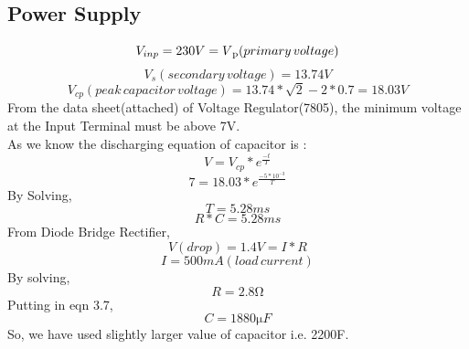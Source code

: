         \subsection{Power Supply}
       \begin{equation}
      V_{inp}=230V=V\textsubscript{p} (primary\,voltage) 
      \end{equation} 
      \begin{equation}
       V_{s}(secondary\,voltage)=13.74V
             \end{equation} 
             \begin{equation}
             V_{cp}(peak\,capacitor\,voltage)=13.74*\sqrt{2}-2*0.7 = 18.03V
            \end{equation}
            From the data sheet(attached) of Voltage Regulator(7805), the minimum voltage at the Input Terminal must be above 7V.\\
           As we know the discharging equation of capacitor is :
             \begin{equation}
             V=V_{cp}*e^\frac{-t}{T}
             \end{equation}
            \begin{equation}
            7=18.03*e^\frac{-5*10^{-3}}{T}
             \end{equation}
             By Solving,
             \begin{equation}
             T=5.28ms
             \end{equation}
              \begin{equation}
             R*C=5.28ms
             \end{equation}
             From Diode Bridge Rectifier,
              \begin{equation}
             V(drop)=1.4V=I*R
             \end{equation}
              \begin{equation}
            I=500mA(load\,current)
             \end{equation}
       	By solving, 
       	\begin{equation}
             R=2.8{\si{\ohm}}
             \end{equation}
             Putting in eqn 3.7,
             \begin{equation}
             C=1880{\si\micro}F
             \end{equation}
             So, we have used slightly larger value of capacitor i.e. 2200{\si\micro}F.
